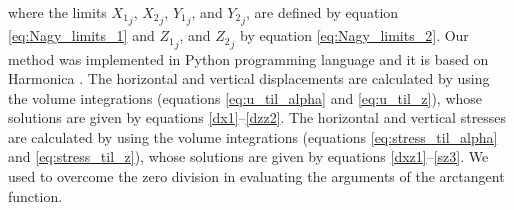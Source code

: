 \documentclass[P]{BrJG_submit}
\begin{document}
where the limits ${X_1}_{j}$, ${X_2}_{j}$, ${Y_1}_{j}$, and ${Y_2}_{j}$, are defined by equation \ref{eq:Nagy_limits_1} and ${Z_1}_{j}$, and ${Z_2}_{j}$ by equation \ref{eq:Nagy_limits_2}.
Our method was implemented in Python programming language and it is based on Harmonica \citep{Uieda2020}.
The horizontal and vertical displacements are calculated by using 
the volume integrations (equations \ref{eq:u_til_alpha} and \ref{eq:u_til_z}), whose solutions
are given by equations \ref{dx1}--\ref{dzz2}. 
The horizontal and vertical stresses are calculated by using the volume integrations (equations \ref{eq:stress_til_alpha} and \ref{eq:stress_til_z}),
whose solutions are given by equations \ref{dxz1}--\ref{sz3}. 
We used \cite{Fukushima2020} to overcome the zero division in evaluating the arguments of the arctangent function.

\end{document}

